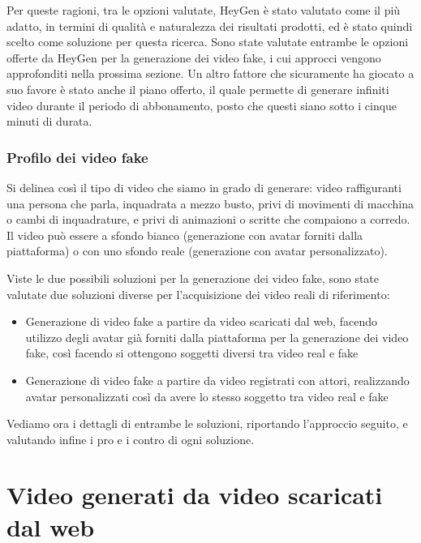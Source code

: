Per queste ragioni, tra le opzioni valutate, HeyGen è stato valutato come il più adatto, in termini di qualità e naturalezza dei risultati prodotti, ed è stato quindi scelto come soluzione per questa ricerca. Sono state valutate entrambe le opzioni offerte da HeyGen per la generazione dei video fake, i cui approcci vengono approfonditi nella prossima sezione. Un altro fattore che sicuramente ha giocato a suo favore è stato anche il piano offerto, il quale permette di generare infiniti video durante il periodo di abbonamento, posto che questi siano sotto i cinque minuti di durata.

\subsubsection{Profilo dei video fake}
Si delinea così il tipo di video che siamo in grado di generare: video raffiguranti una persona che parla, inquadrata a mezzo busto, privi di movimenti di macchina o cambi di inquadrature, e privi di animazioni o scritte che compaiono a corredo. Il video può essere a sfondo bianco (generazione con avatar forniti dalla piattaforma) o con uno sfondo reale (generazione con avatar personalizzato).

Viste le due possibili soluzioni per la generazione dei video fake, sono state valutate due soluzioni diverse per l'acquisizione dei video reali di riferimento:
\begin{itemize}
    \item Generazione di video fake a partire da video scaricati dal web, facendo utilizzo degli avatar già forniti dalla piattaforma per la generazione dei video fake, così facendo si ottengono soggetti diversi tra video real e fake
    \item Generazione di video fake a partire da video registrati con attori, realizzando avatar personalizzati così da avere lo stesso soggetto tra video real e fake
\end{itemize}

Vediamo ora i dettagli di entrambe le soluzioni, riportando l'approccio seguito, e valutando infine i pro e i contro di ogni soluzione.

\section{Video generati da video scaricati dal web}
\label{sec:generati_dal_web}

